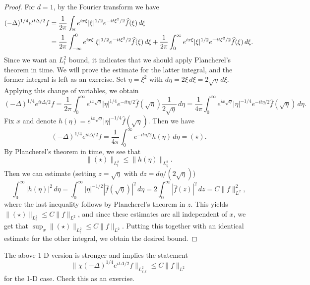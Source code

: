 \begin{proof}
  For $d = 1$, by the Fourier transform we have
  \begin{align*}
    (-\Delta)^{1 / 4} e^{it \Delta / 2} f
    &= \frac{1}{2\pi} \int_{\mathbb{R}} e^{ix \xi} |\xi|^{1 / 2} e^{-it \xi^2 / 2} \widehat{f}(\xi)\, d\xi \\
    &= \frac{1}{2\pi} \int_{-\infty}^0 e^{ix \xi} |\xi|^{1 / 2} e^{-it \xi^2 / 2} \widehat{f}(\xi)\, d\xi
    + \frac{1}{2\pi} \int_{0}^\infty e^{ix \xi} |\xi|^{1 / 2} e^{-it \xi^2 / 2} \widehat{f}(\xi)\, d\xi.
  \end{align*}
  Since we want an $L^2_t$ bound, it indicates
  that we should apply Plancherel's theorem in time.
  We will prove the estimate for the latter integral, and
  the former integral is left as an exercise.
  Set $\eta = \xi^2$ with $d\eta = 2\xi\, d\xi = 2 \sqrt{\eta}\, d\xi$.
  Applying this change of variables, we obtain
  \[
    (-\Delta)^{1 / 4} e^{it \Delta / 2} f
    = \frac{1}{2\pi} \int_0^\infty e^{ix \sqrt{\eta}} |\eta|^{1 / 4} e^{-it \eta / 2} \widehat{f}(\sqrt{\eta}) \frac{1}{2\sqrt{\eta}} \, d\eta
    = \frac{1}{4\pi} \int_0^\infty e^{ix \sqrt{\eta}}
    |\eta|^{-1 / 4} e^{-it\eta / 2} \widehat{f}(\sqrt{\eta})\, d\eta.
  \]
  Fix $x$ and denote $h(\eta) = e^{ix \sqrt{\eta}} |\eta|^{-1 / 4} \widehat{f}(\sqrt{\eta})$. Then we have
  \[
    (-\Delta)^{1 / 4} e^{it \Delta / 2} f
    = \frac{1}{4\pi} \int_0^\infty e^{-it \eta / 2} h(\eta)\, d\eta = (\star).
  \]
  By Plancherel's theorem in time, we see that
  \[
    \| (\star) \|_{L^2_t}
    \le \|h(\eta)\|_{L^2_\eta}.
  \]
  Then we can estimate (setting $z = \sqrt{\eta}$ with
  $dz = d\eta / (2\sqrt{\eta})$)
  \[
    \int_0^\infty |h(\eta)|^2\, d\eta
    = \int_0^\infty |\eta|^{-1 / 2} |\widehat{f}(\sqrt{\eta})|^2\, d\eta
    = 2 \int_0^\infty |\widehat{f}(z)|^2\, dz
    = C \|f\|_{L^2}^2,
  \]
  where the last inequality follows by Plancherel's
  theorem in $z$. This yields
  $\|(\star)\|_{L^2_t} \le C \|f\|_{L^2}$, and since
  these estimates are all independent
  of $x$, we get that $\sup_x \|(\star)\|_{L^2_t} \le C\|f\|_{L^2}$.
  Putting this together with an identical estimate
  for the other integral, we obtain the desired
  bound.
\end{proof}

\begin{remark}
  The above 1-D version is stronger and implies the
  statement
  \[
    \| \chi (-\Delta)^{1 / 4} e^{it \Delta / 2} f\|_{L^2_{x, t}}
    \le C \|f\|_{L^2}
  \]
  for the 1-D case. Check this as an exercise.
\end{remark}

